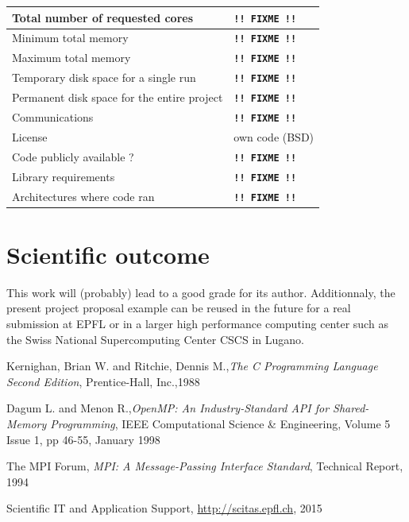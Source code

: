 \documentclass[11pt,a4paper]{article}
\begin{document}
\begin{center}
\begin{tabular}{| l | l |}
	\hline
	Total number of requested cores & \textbf{\texttt{!! FIXME !!}}\\
	\hline
	Minimum total memory & \textbf{\texttt{!! FIXME !!}} \\
	\hline
	Maximum total memory & \textbf{\texttt{!! FIXME !!}} \\
	\hline
	Temporary disk space for a single run & \textbf{\texttt{!! FIXME !!}} \\
	\hline
	Permanent disk space for the entire project & \textbf{\texttt{!! FIXME !!}} \\
	\hline
	Communications & \textbf{\texttt{!! FIXME !!}} \\
	\hline
	License & own code (BSD) \\
	\hline
	Code publicly available ? & \textbf{\texttt{!! FIXME !!}} \\
	\hline
	Library requirements & \textbf{\texttt{!! FIXME !!}} \\
	\hline
	Architectures where code ran & \textbf{\texttt{!! FIXME !!}}  \\
	\hline
\end{tabular}
\end{center}
\section{Scientific outcome}

This work will (probably) lead to a good grade for its author. Additionnaly, the present project proposal example can be reused in the future for a real submission at EPFL or in a larger high performance computing center such as the Swiss National Supercomputing Center CSCS in Lugano. 

\begin{thebibliography}{1}

 Kernighan, Brian W. and Ritchie, Dennis M.,{\em The C Programming Language Second Edition}, Prentice-Hall, Inc.,1988

 Dagum L. and Menon R.,{\em  OpenMP: An Industry-Standard API for Shared-Memory Programming}, IEEE Computational Science \& Engineering, Volume 5 Issue 1, pp 46-55, January 1998

 The MPI Forum, {\em MPI: A Message-Passing Interface Standard}, Technical Report, 1994

 Scientific IT and Application Support, \url{http://scitas.epfl.ch}, 2015

\end{thebibliography}
\end{document}
